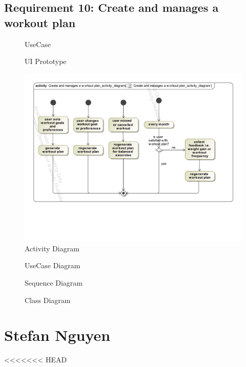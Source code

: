 \documentclass{article}
\begin{document}
	\subsection{Requirement 10: Create and manages a workout plan}
		\begin{figure}[h!]
			\centering
			\captionsetup{labelformat=empty}
			\caption{UseCase}
		\end{figure}
		\newpage
		\begin{figure}[h!]
			\centering
			\captionsetup{labelformat=empty}
			\caption{UI Prototype}
		\end{figure}
		\newpage
		\begin{figure}[h!]
		    \centering
		    \captionsetup{labelformat=empty}
		    \caption{Activity Diagram}
		    \includegraphics[width=\textwidth, angle=0]{Marc/req10/10activity.pdf}
		\end{figure}
		\newpage
		\begin{figure}[h!]
			\centering
			\captionsetup{labelformat=empty}
			\caption{UseCase Diagram}
		\end{figure}
		\newpage
		\begin{figure}[h!]
			\centering
			\captionsetup{labelformat=empty}
			\caption{Sequence Diagram}
		\end{figure}
		\newpage
		\begin{figure}[h!]
			\centering
			\captionsetup{labelformat=empty}
			\caption{Class Diagram}
		\end{figure}
		\newpage
			

\section{Stefan Nguyen}
<<<<<<< HEAD
\end{document}
